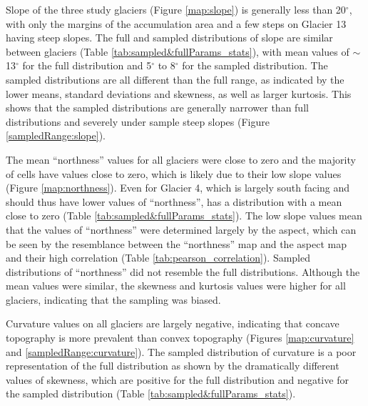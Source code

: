 \documentclass{sfuthesis}
\begin{document}
Slope of the three study glaciers (Figure \ref{map:slope}) is generally less than 20$^{\circ}$, with only the margins of the accumulation area and a few steps on Glacier 13 having steep slopes. The full and sampled distributions of slope are similar between glaciers (Table \ref{tab:sampled&fullParams_stats}), with mean values of $\sim$13$^{\circ}$ for the full distribution and 5$^{\circ}$ to 8$^{\circ}$ for the sampled distribution. The sampled distributions are all different than the full range, as indicated by the lower means, standard deviations and skewness, as well as larger kurtosis. This shows that the sampled distributions are generally narrower than full distributions and severely under sample steep slopes (Figure \ref{sampledRange:slope}).

The mean ``northness'' values for all glaciers were close to zero and the majority of cells have values close to zero, which is likely due to their low slope values (Figure \ref{map:northness}). Even for Glacier 4, which is largely south facing and should thus have lower values of ``northness'', has a distribution with a mean close to zero (Table \ref{tab:sampled&fullParams_stats}). The low slope values mean that the values of ``northness'' were determined largely by the aspect, which can be seen by the resemblance between the ``northness'' map and the aspect map and their high correlation (Table \ref{tab:pearson_correlation}). Sampled distributions of ``northness'' did not resemble the full distributions. Although the mean values were similar, the skewness and kurtosis values were higher for all glaciers, indicating that the sampling was biased.

Curvature values on all glaciers are largely negative, indicating that concave topography is more prevalent than convex topography (Figures \ref{map:curvature} and \ref{sampledRange:curvature}). The sampled distribution of curvature is a poor representation of the full distribution as shown by the dramatically different values of skewness, which are positive for the full distribution and negative for the sampled distribution (Table \ref{tab:sampled&fullParams_stats}). 
\end{document}
